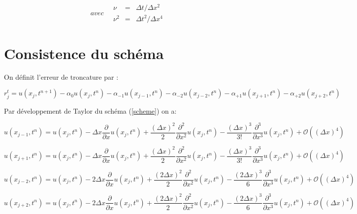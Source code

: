 \documentclass[a4paper,11pt]{article}
\begin{document}
\begin{equation*}
    avec \quad
    \begin{array}{rcl}
        \nu &=& \Delta t/\Delta x^{2} \\
        \nu^{2} &=& \Delta t^{2}/\Delta x^{4}
    \end{array}
\end{equation*}


\section{Consistence du schéma}

On définit l'erreur de troncature par :

\begin{equation*}
    r^{t}_{j} = u(x_{j}, t^{n+1}) -\alpha_{0} u(x_{j}, t^{n}) -\alpha_{-1} u(x_{j-1}, t^{n}) -\alpha_{-2} u(x_{j-2}, t^{n}) -\alpha_{+1} u(x_{j+1}, t^{n}) -\alpha_{+2} u(x_{j+2}, t^{n})
\end{equation*}

Par développement de Taylor du schéma (\ref{scheme}) on a:

\begin{equation*}
    u(x_{j-1}, t^{n}) =
    u(x_{j}, t^{n})
     - \Delta x \frac{\partial}{\partial x}u(x_{j}, t^{n})
     + \frac{(\Delta x)^{2}}{2} \frac{\partial^{2}}{\partial x^{2}}u(x_{j}, t^{n})
     - \frac{(\Delta x)^{3}}{3!} \frac{\partial^{3}}{\partial x^{3}}u(x_{j}, t^{n})
     + \mathcal{O}((\Delta x)^{4})
\end{equation*}

\begin{equation*}
    u(x_{j+1}, t^{n}) =
    u(x_{j}, t^{n})
     - \Delta x \frac{\partial}{\partial x}u(x_{j}, t^{n})
     + \frac{(\Delta x)^{2}}{2} \frac{\partial^{2}}{\partial x^{2}}u(x_{j}, t^{n})
     - \frac{(\Delta x)^{3}}{3!} \frac{\partial^{3}}{\partial x^{3}}u(x_{j}, t^{n})
     + \mathcal{O}((\Delta x)^{4})
\end{equation*}

\begin{equation*}
    u(x_{j-2}, t^{n}) =
    u(x_{j}, t^{n})
     - 2\Delta x \frac{\partial}{\partial x}u(x_{j}, t^{n})
     + \frac{(2\Delta x)^{2}}{2} \frac{\partial^{2}}{\partial x^{2}}u(x_{j}, t^{n})
     - \frac{(2\Delta x)^{3}}{6} \frac{\partial^{3}}{\partial x^{3}}u(x_{j}, t^{n})
     + \mathcal{O}((\Delta x)^{4})
\end{equation*}

\begin{equation*}
    u(x_{j+2}, t^{n}) =
    u(x_{j}, t^{n})
     - 2\Delta x \frac{\partial}{\partial x}u(x_{j}, t^{n})
     + \frac{(2\Delta x)^{2}}{2} \frac{\partial^{2}}{\partial x^{2}}u(x_{j}, t^{n})
     - \frac{(2\Delta x)^{3}}{6} \frac{\partial^{3}}{\partial x^{3}}u(x_{j}, t^{n})
     + \mathcal{O}((\Delta x)^{4})
\end{equation*}
\end{document}
